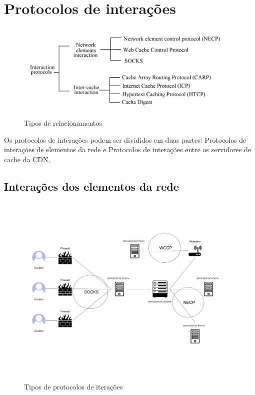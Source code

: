 \section{Protocolos de intera\c{c}\~oes}
\label{section:protocolos_interacoes}
\begin{figure}[H]
\caption{Tipos de relacionamentos}
\includegraphics[width=15cm]{Figuras/tipos_relacionamentos.png} 
\label{figura:tipos_relacionamentos}
\end{figure}

Os protocolos de intera\c{c}\~oes podem ser divididos em duas partes: Protocolos de intera\c{c}\~oes de elementos da rede e Protocolos de intera\c{c}\~oes entre os servidores de cache da CDN. 


\subsection{Intera\c{c}\~oes dos elementos da rede}
\begin{figure}[H]
\caption{Tipos de protocolos de itera\c{c}\~oes}
\includegraphics[height=9cm]{Figuras/protocolos_interacao_elementos.png} 
\label{figura:protocolos_interacao_elementos}
\end{figure}


